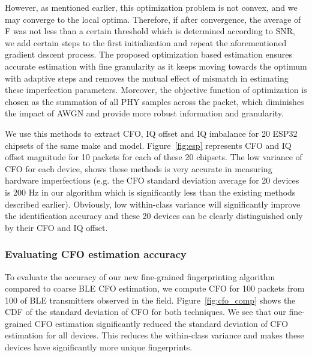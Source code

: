 However, as mentioned earlier, this optimization problem is not convex, and we may converge to the local optima. Therefore, if after convergence, the average of F was not less than a certain threshold which is determined according to SNR, we add certain steps to the first initialization and repeat the aforementioned gradient descent process. The proposed optimization based estimation ensures accurate estimation with fine granularity as it keeps moving towards the optimum with adaptive steps and removes the mutual effect of mismatch in estimating these imperfection parameters. Moreover, the objective function of optimization is chosen as the summation of all PHY samples across the packet, which diminishes the impact of AWGN and provide more robust information and granularity.

We use this methods to extract CFO, IQ offset and IQ imbalance for 20 ESP32 chipsets of the same make and model. Figure~\ref{fig:esp} represents CFO and IQ offset magnitude for 10 packets for each of these 20 chipsets. The low variance of CFO for each device, shows these methods is very accurate in measuring hardware imperfections (e.g. the CFO standard deviation average for 20 devices is 200 Hz in our algorithm which is significantly less than the existing methods described earlier). Obviously, low within-class variance will significantly improve the identification accuracy and these 20 devices can be clearly distinguished only by their CFO and IQ offset. 
\fi

%
\subsubsection*{\textbf{Evaluating CFO estimation accuracy}}
To evaluate the accuracy of our new fine-grained fingerprinting algorithm compared to coarse BLE
CFO estimation, 
we compute CFO for 100 packets from 100 of BLE transmitters observed in the field.%
%
Figure~\ref{fig:cfo_comp} shows the CDF of the standard deviation of CFO for both techniques.
%
We see that 
our fine-grained CFO estimation significantly reduced the standard deviation of CFO estimation for all devices. This reduces the within-class variance and
makes these devices have significantly more unique fingerprints.
%

